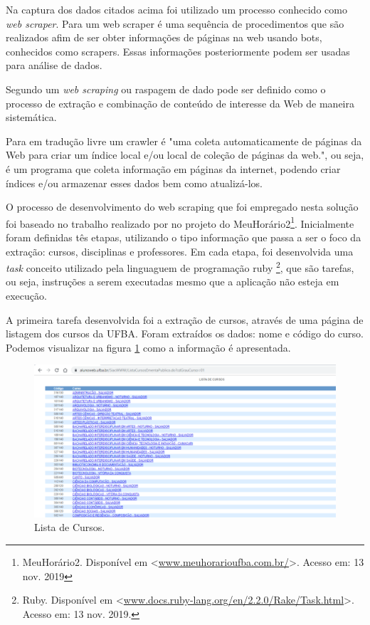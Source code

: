 \documentclass[12pt, a4paper]{report}
\begin{document}
Na captura dos dados citados acima foi utilizado um processo conhecido como  \textit{web scraper}. Para \cite{laender2002} um web scraper é uma sequência de procedimentos que são realizados afim de ser obter informações de páginas na web usando bots, conhecidos como scrapers. Essas informações posteriormente podem ser usadas para análise de dados.

Segundo \cite{Glezscraping2013} um \textit{web scraping} ou raspagem de dado pode ser definido como o processo de extração e combinação de conteúdo de
interesse da Web de maneira sistemática.

Para \cite[p. 1]{ilprints376} em tradução livre um crawler é "uma coleta automaticamente de páginas da Web para criar um índice local e/ou local de coleção de páginas da web.", ou seja, é um programa que coleta informação em páginas da internet, podendo criar índices e/ou armazenar esses dados bem como atualizá-los. 

O processo de desenvolvimento do web scraping que foi empregado nesta solução foi baseado no trabalho realizado por \citeauthor{assis2017meuhorario} no projeto do MeuHorário2\footnote{MeuHorário2. Disponível em <\url{www.meuhorarioufba.com.br/}>. Acesso em: 13 nov. 2019}. Inicialmente foram definidas tês etapas, utilizando o tipo informação que passa a ser o foco da extração: cursos, disciplinas e professores.  Em cada etapa, foi desenvolvida uma \textit{task} conceito utilizado pela linguaguem de programação ruby \footnote{Ruby. Disponível em <\url{www.docs.ruby-lang.org/en/2.2.0/Rake/Task.html}>. Acesso em: 13 nov. 2019.}, que são tarefas, ou seja, instruções a serem executadas mesmo que a aplicação não esteja em execução. 

A primeira tarefa desenvolvida foi a extração de cursos, através de uma página de listagem dos cursos da UFBA. Foram extraídos os dados: nome e código do curso. Podemos visualizar na figura \ref{fig:lista_cursos} como a informação é apresentada.

\begin{figure}
\centering
\includegraphics[scale=0.9]{lista_cursos.png}
\caption{Lista de Cursos.}
\label{fig:lista_cursos}
\end{figure}
\end{document}
